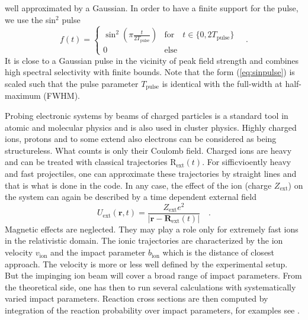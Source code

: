 \documentclass[final,1p]{elsarticle}
\begin{document}
well approximated by a Gaussian.  In order to have a finite support
for the pulse, we use the sin$^2$ pulse
\begin{equation}
  f(t)
  =
  \left\{\begin{array}{ll}
    \sin^2{\left(\pi\frac{t}{2T_\mathrm{pulse}}\right)}
        &\mbox{for}\quad t\in\{0,2T_\mathrm{pulse}\}  \\
    0  &\mbox{else}
  \end{array}\right.
  \quad.
\label{eq:sinpulse}
\end{equation}
It is close to a Gaussian pulse in the vicinity of peak field strength
and combines high spectral selectivity with finite bounds. Note that
the form (\ref{eq:sinpulse}) is scaled such that the pulse parameter
$T_\mathrm{pulse}$ is identical with the {full-width at
half-maximum} ({FWHM}).



Probing electronic systems by beams of charged particles is a standard
tool in atomic and molecular physics \cite{Bra92} and is also used in
cluster physics. Highly charged ions, protons and to some extend also
electrons can be considered as being structureless. What counts is
only their Coulomb field.  Charged ions are heavy and can be treated
with classical trajectories
%
$\mathrm{R}_\mathrm{ext}(t)$.
%
For sifficvioently heavy and fast projectiles, one can approximate
these trajectories by straight lines and that is what is done in the
code.  In any case, the effect of the ion (charge $Z_\mathrm{ext}$) on
the system can again be described by a time dependent external field
\begin{equation}
  U_\mathrm{ext}(\mathbf{r},t)
  =
  \frac{Z_\mathrm{ext}e^2}{|\mathbf{r}-\mathbf{R}_\mathrm{ext}(t)|}
  \quad.
\label{eq:ionext}
\end{equation}
Magnetic effects are neglected. They may play a role only for extremely
fast ions in the relativistic domain.
%
The ionic trajectories are characterized by the ion velocity
$v_\mathrm{ion}$ and the impact parameter $b_\mathrm{ion}$ which is
the distance of closest approach. The velocity is more or less well
defined by the experimental setup. But the impinging ion beam will
cover a broad range of impact parameters. From the theoretical side,
one has then to run several calculations with systematically varied
impact parameters.  Reaction cross sections are then computed by
integration of the reaction probability over impact parameters, for
examples see \cite{Rei98a}.
\end{document}
